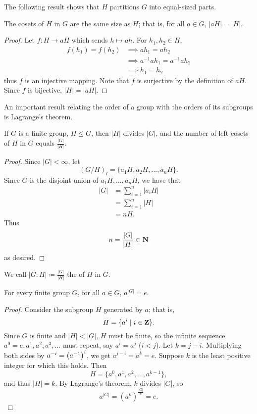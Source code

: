 The following result shows that $H$ partitions $G$ into equal-sized parts.

\begin{lemma}
The cosets of $H$ in $G$ are the same size as $H$; that is, for all $a\in G$, $|aH|=|H|$.
\end{lemma}

\begin{proof}
Let $f:H\to aH$ which sends $h\mapsto ah$. For $h_1,h_2\in H$,
\begin{align*}
f(h_1)=f(h_2)
&\implies ah_1=ah_2\\
&\implies a^{-1}ah_1=a^{-1}ah_2\\
&\implies h_1=h_2
\end{align*}
thus $f$ is an injective mapping. Note that $f$ is surjective by the definition of $aH$. Since $f$ is bijective, $|H|=|aH|$.
\end{proof}

An important result relating the order of a group with the orders of its subgroups is Lagrange's theorem.

\begin{theorem}
If $G$ is a finite group, $H\le G$, then $|H|$ divides $|G|$, and the number of left cosets of $H$ in $G$ equals $\frac{|G|}{|H|}$.
\end{theorem}

\begin{proof}
Since $|G|<\infty$, let
\[(G/H)_{l}=\{a_1H,a_2H,\dots,a_nH\}.\]
Since $G$ is the disjoint union of $a_1H,\dots,a_nH$, we have that
\begin{align*}
|G|&=\sum_{i=1}^{n}|a_iH|\\
&=\sum_{i=1}^{n}|H|\\
&=nH.
\end{align*}
Thus
\[n=\frac{|G|}{|H|}\in\mathbf N\]
as desired.
\end{proof}

We call $|G:H|\coloneqq\frac{|G|}{|H|}$ the  of $H$ in $G$.

\begin{theorem}
For every finite group $G$, for all $a \in G$, $a^{|G|}=e$.
\end{theorem}

\begin{proof}
Consider the subgroup $H$ generated by $a$; that is,
\[H=\{a^i\mid i\in\mathbf Z\}.\]
Since $G$ is finite and $|H|<|G|$, $H$ must be finite, so the infinite sequence $a^0=e,a^1,a^2,a^3,\dots$ must repeat, say $a^i=a^j$ ($i<j$). Let $k=j-i$. Multiplying both sides by $a^{-i}=\left(a^{-1}\right)^i$, we get $a^{j-i} = a^k = e$. Suppose $k$ is the least positive integer for which this holds. Then
\[H=\{a^0,a^1,a^2,\dots,a^{k-1}\},\]
and thus $|H|=k$. By Lagrange's theorem, $k$ divides $|G|$, so
\[a^{|G|}=(a^k)^\frac{|G|}{k}=e.\]
\end{proof}

